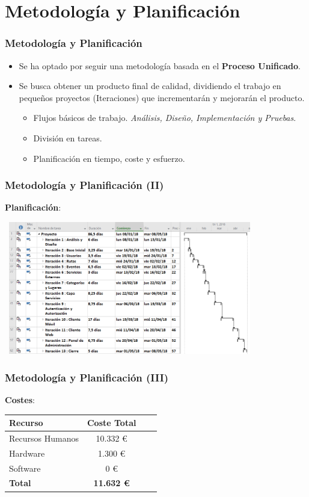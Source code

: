 \documentclass[usenames,dvipsnames]{beamer}
\begin{document}
\section{Metodología y Planificación}

\begin{frame}
\frametitle{Metodología y Planificación}
\begin{itemize}
\item Se ha optado por seguir una metodología basada en el \textbf{Proceso Unificado}.
\item Se busca obtener un producto final de calidad, dividiendo el trabajo en pequeños proyectos (Iteraciones) que incrementarán y mejorarán el producto. 
\begin{itemize}
\item Flujos básicos de trabajo. \textit{Análisis, Diseño, Implementación y Pruebas}.
\item División en tareas.
\item Planificación en tiempo, coste y esfuerzo.
\end{itemize}
\end{itemize}
\end{frame}


\begin{frame}
\frametitle{Metodología y Planificación (II)}
\textbf{Planificación}:


\vspace{0.5cm}
\centering
\includegraphics[width=11cm, height=5.8cm]{./img/gantt.png}
\end{frame}


\begin{frame}
\frametitle{Metodología y Planificación (III)}
\textbf{Costes}:
\begin{table}[H]
\centering
\begin{tabular}{|l|c|c|c|}
\hline
\textbf{Recurso} & \textbf{Coste Total} \\ \hline
Recursos Humanos &  10.332 € \\ \hline
Hardware & 1.300 €  \\ \hline
Software & 0 €  \\ \hline
\textbf{Total} & \textbf{11.632 €} \\ \hline
\end{tabular}
\end{table}
\end{frame}
\end{document}
